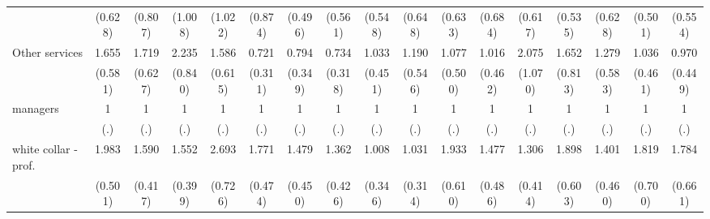 {\begin{tabular}{l*{16}{c}}
                    &     (0.628)         &     (0.807)         &     (1.008)         &     (1.022)         &     (0.874)         &     (0.496)         &     (0.561)         &     (0.548)         &     (0.648)         &     (0.633)         &     (0.684)         &     (0.617)         &     (0.535)         &     (0.628)         &     (0.501)         &     (0.554)         \\
[1em]
Other services      &       1.655         &       1.719         &       2.235\sym{*}  &       1.586         &       0.721         &       0.794         &       0.734         &       1.033         &       1.190         &       1.077         &       1.016         &       2.075         &       1.652         &       1.279         &       1.036         &       0.970         \\
                    &     (0.581)         &     (0.627)         &     (0.840)         &     (0.615)         &     (0.311)         &     (0.349)         &     (0.318)         &     (0.451)         &     (0.546)         &     (0.500)         &     (0.462)         &     (1.070)         &     (0.813)         &     (0.583)         &     (0.461)         &     (0.449)         \\
[1em]
managers            &           1         &           1         &           1         &           1         &           1         &           1         &           1         &           1         &           1         &           1         &           1         &           1         &           1         &           1         &           1         &           1         \\
                    &         (.)         &         (.)         &         (.)         &         (.)         &         (.)         &         (.)         &         (.)         &         (.)         &         (.)         &         (.)         &         (.)         &         (.)         &         (.)         &         (.)         &         (.)         &         (.)         \\
[1em]
white collar - prof.&       1.983\sym{**} &       1.590         &       1.552         &       2.693\sym{***}&       1.771\sym{*}  &       1.479         &       1.362         &       1.008         &       1.031         &       1.933\sym{*}  &       1.477         &       1.306         &       1.898\sym{*}  &       1.401         &       1.819         &       1.784         \\
                    &     (0.501)         &     (0.417)         &     (0.399)         &     (0.726)         &     (0.474)         &     (0.450)         &     (0.426)         &     (0.346)         &     (0.314)         &     (0.610)         &     (0.486)         &     (0.414)         &     (0.603)         &     (0.460)         &     (0.700)         &     (0.661)         \\

\end{tabular}}
